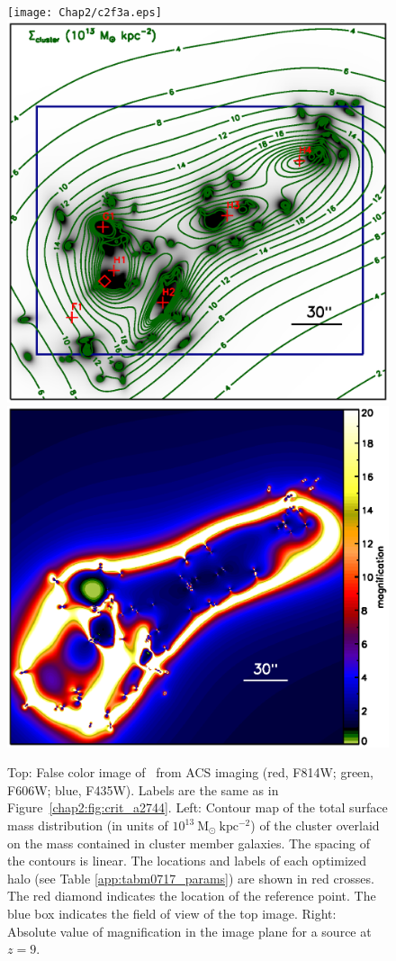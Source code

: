 \begin{figure}[h]
\centering
\texttt{[image: Chap2/c2f3a.eps]} \\
\includegraphics[height=0.28\textheight]{Chap2/c2f3b.eps}
\includegraphics[height=0.28\textheight]{Chap2/c2f3c.eps}
\caption[\MACSzeroseven\ image constraints and critical curves]{Top: False color image of \MACSzeroseven\ from ACS imaging (red, F814W; green, F606W; blue, F435W). Labels are the same as in Figure~\ref{chap2:fig:crit_a2744}. Left: Contour map of the total surface mass distribution (in units of $10^{13}\ \mathrm{M_\odot \ kpc^{-2}}$) of the cluster overlaid on the mass contained in cluster member galaxies. The spacing of the contours is linear. The locations and labels of each optimized halo (see Table \ref{app:tabm0717_params}) are shown in red crosses. The red diamond indicates the location of the reference point. The blue box indicates the field of view of the top image. Right: Absolute value of magnification in the image plane for a source at $z=9$.}

\end{figure}
